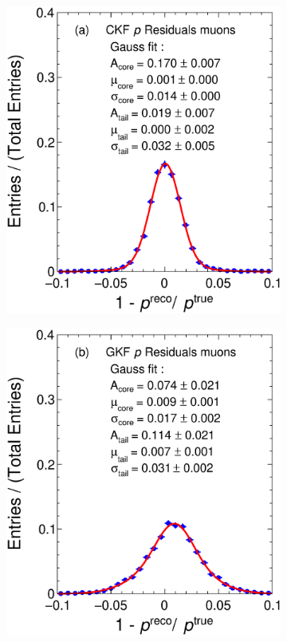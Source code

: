 \begin{figure}[t]
     \centering
     \begin{subfigure}{0.42\textwidth}
         \centering
         \includegraphics[width=\textwidth]{figures/ch5-KF_NDGAr/FullSample/PGun/pRes/Resp13pgun.eps}
         \caption{}
         \label{fig:pResCKF13_PGun}
     \end{subfigure}
     \begin{subfigure}{0.42\textwidth}
         \centering
         \includegraphics[width=\textwidth]{figures/ch5-KF_NDGAr/FullSample/PGun/pRes/RespGAr13pgun.eps}

\end{subfigure}
\end{figure}

